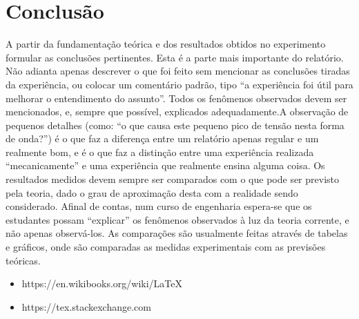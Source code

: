 \documentclass[10pt,conference]{IEEEtran}                      %
\begin{document}
\section{Conclusão}
A partir da fundamentação teórica e dos resultados obtidos no experimento formular as conclusões pertinentes. Esta é a parte mais importante do relatório. Não adianta apenas descrever o que foi feito sem mencionar as conclusões tiradas da experiência, ou colocar um comentário padrão, tipo “a experiência foi útil para melhorar o entendimento do assunto”. Todos os fenômenos observados devem ser mencionados, e, sempre que possível, explicados adequadamente.A observação de pequenos detalhes (como: “o que causa este pequeno pico de tensão nesta forma de onda?”) é o que faz a diferença entre um relatório apenas regular e um realmente bom, e é o que faz a distinção entre uma experiência realizada “mecanicamente” e uma experiência que realmente ensina alguma coisa. Os resultados medidos devem sempre ser comparados com o que pode ser previsto pela teoria, dado o grau de aproximação desta com a realidade sendo considerado. Afinal de contas, num curso de engenharia espera-se que os estudantes possam “explicar” os fenômenos observados à luz da teoria corrente, e não apenas observá-los. As comparações são usualmente feitas através de tabelas e gráficos, onde são comparadas as medidas experimentais com as previsões teóricas.
\begin{itemize}
	\item https://en.wikibooks.org/wiki/LaTeX
	\item https://tex.stackexchange.com
\end{itemize}


\end{document}
